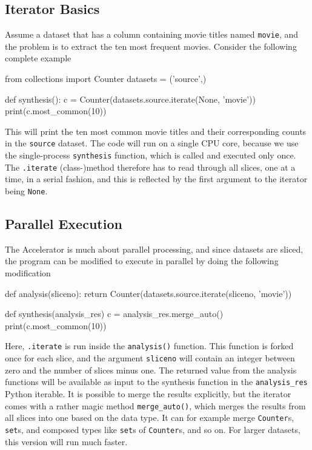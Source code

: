 \subsection{Iterator Basics}

Assume a dataset that has a column containing movie titles named
\texttt{movie}, and the problem is to extract the ten most frequent
movies.  Consider the following complete example
\begin{python}
from collections import Counter
datasets = ('source',)

def synthesis():
    c = Counter(datasets.source.iterate(None, 'movie'))
    print(c.most_common(10))
\end{python}
This will print the ten most common movie titles and their
corresponding counts in the \texttt{source} dataset.  The code will
run on a single CPU core, because we use the single-process
\texttt{synthesis} function, which is called and executed only once.
The \texttt{.iterate} (class-)method therefore has to read through all
slices, one at a time, in a serial fashion, and this is reflected by
the first argument to the iterator being \texttt{None}.



\subsection{Parallel Execution}
The Accelerator is much about parallel processing, and since datasets
are sliced, the program can be  modified to execute in parallel by
doing the following modification
\begin{python}
def analysis(sliceno):
    return Counter(datasets.source.iterate(sliceno, 'movie'))

def synthesis(analysis_res)
    c = analysis_res.merge_auto()
    print(c.most_common(10))
\end{python}
Here, \texttt{.iterate} is run inside the \texttt{analysis()}
function.  This function is forked once for each slice, and the
argument \texttt{sliceno} will contain an integer between zero and the
number of slices minus one.  The returned value from the analysis
functions will be available as input to the synthesis function in the
\texttt{analysis\_res} Python iterable.  It is possible to merge the
results explicitly, but the iterator comes with a rather magic method
\texttt{merge\_auto()}, which merges the results from all slices into
one based on the data type.  It can for example merge
\texttt{Counter}s, \texttt{set}s, and composed types like
\texttt{set}s of \texttt{Counter}s, and so on.  For larger datasets,
this version will run much faster.




